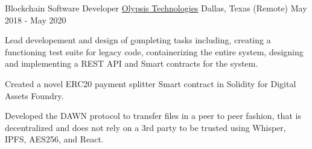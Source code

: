 \begin{cventries}
	\cventry
	{Blockchain Software Developer}
	{\href{https://www.olypsis.com/}{Olypsis Technologies}}
	{Dallas, Texas (Remote)} %
	{May 2018 - May 2020} %
	{
		\begin{cvitems} %
			\item {Lead developement and design of \href{https://blocknkey.com/}
			            completing tasks including, creating a functioning test
			            suite for legacy code, containerizing the entire system,
			            designing and implementing a REST API and Smart contracts
			            for the system.
			      }
			\item {Created a novel ERC20 payment splitter Smart contract in Solidity for Digital Assets
			            Foundry.}
			\item {Developed the DAWN protocol to transfer files in a peer to
			            peer fashion, that is decentralized and does not rely on a
			            3rd party to be trusted using Whisper, IPFS, AES256, and React.}
		\end{cvitems}
	}




\end{cventries}
